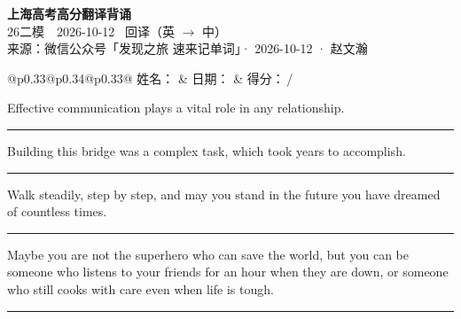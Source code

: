 \documentclass[11pt,a4paper]{article}
\newcommand{\num}[1]{\makebox[1.9em][r]{#1.}\hspace{0.3em}}
\newcommand{\wline}{\noindent\rule{\linewidth}{0.4pt}}
\begin{document}
\pagestyle{plain}
\begin{center}
{\LARGE\bfseries 上海高考高分翻译背诵 }\\[0.25em]
{\large 26二模　2026-10-12 \quad\ 回译（英 $\to$ 中）}\\[0.35em]
{\footnotesize 来源：微信公众号「发现之旅 速来记单词」· 2026-10-12 · 赵文瀚}
\end{center}

\vspace{0.4em}
\noindent\begin{tabular}{@{}p{0.33\textwidth}@{}p{0.34\textwidth}@{}p{0.33\textwidth}@{}}
姓名：\underline{\hspace{2.0cm}} & 日期：\underline{\hspace{2.0cm}} & 得分：\underline{\hspace{1.4cm}}\,/ \\
\end{tabular}

\vspace{0.5em}

\vspace{0.8em}
\num{1}Effective communication plays a vital role in any relationship.

\vspace{0.25em}

\wline

\num{2}Building this bridge was a complex task, which took years to accomplish.

\vspace{0.25em}

\wline

\num{3}Walk steadily, step by step, and may you stand in the future you have dreamed of countless times.

\vspace{0.25em}

\wline

\num{4}Maybe you are not the superhero who can save the world, but you can be someone who listens to your friends for an hour when they are down, or someone who still cooks with care even when life is tough.

\vspace{0.25em}

\wline
\end{document}
